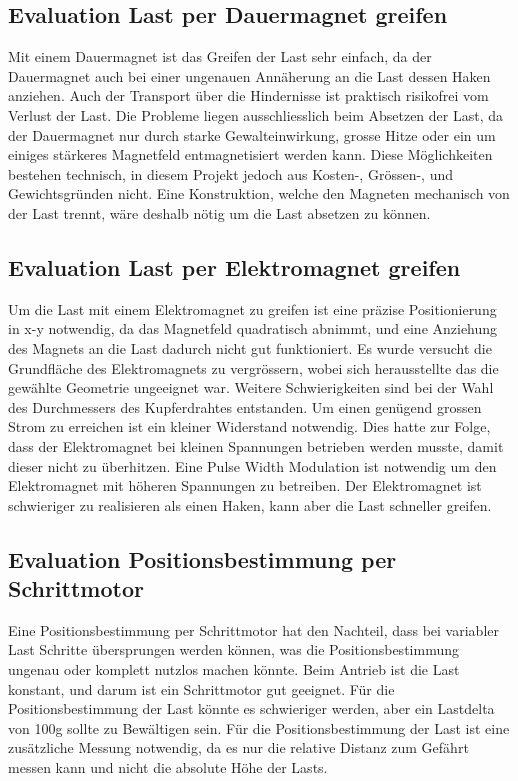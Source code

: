 \documentclass[a4paper]{report}
\begin{document}
\subsection{Evaluation Last per Dauermagnet greifen}
\label{app:ssec:EvalLastMagnet}
Mit einem Dauermagnet ist das Greifen der Last sehr einfach, da der Dauermagnet auch bei einer ungenauen Annäherung an die Last dessen Haken anziehen. Auch der Transport über die Hindernisse ist praktisch risikofrei vom Verlust der Last. Die Probleme liegen ausschliesslich beim Absetzen der Last, da der Dauermagnet nur durch starke Gewalteinwirkung, grosse Hitze oder ein um einiges stärkeres Magnetfeld entmagnetisiert werden kann. Diese Möglichkeiten bestehen technisch, in diesem Projekt jedoch aus Kosten-, Grössen-, und Gewichtsgründen nicht. Eine Konstruktion, welche den Magneten mechanisch von der Last trennt, wäre deshalb nötig um die Last absetzen zu können.

\subsection{Evaluation Last per Elektromagnet greifen}
\label{app:ssec:EvalLastElektroMagnet}
Um die Last mit einem Elektromagnet zu greifen ist eine präzise Positionierung in x-y notwendig, da das Magnetfeld quadratisch abnimmt, und eine Anziehung des Magnets an die Last dadurch nicht gut funktioniert. Es wurde versucht die Grundfläche des Elektromagnets zu vergrössern, wobei sich herausstellte das die gewählte Geometrie ungeeignet war. Weitere Schwierigkeiten sind bei der Wahl des Durchmessers des Kupferdrahtes entstanden. Um einen genügend grossen Strom zu erreichen ist ein kleiner Widerstand notwendig. Dies hatte zur Folge, dass der Elektromagnet bei kleinen Spannungen betrieben werden musste, damit dieser nicht zu überhitzen. Eine Pulse Width Modulation ist notwendig um den Elektromagnet mit höheren Spannungen zu betreiben. Der Elektromagnet ist schwieriger zu realisieren als einen Haken, kann aber die Last schneller greifen.

\subsection{Evaluation Positionsbestimmung per Schrittmotor}
\label{app:ssec:EvalPosBestSchritt}
Eine Positionsbestimmung per Schrittmotor hat den Nachteil, dass bei variabler Last Schritte übersprungen werden können, was die Positionsbestimmung ungenau oder komplett nutzlos machen könnte. Beim Antrieb ist die Last konstant, und darum ist ein Schrittmotor gut geeignet. Für die Positionsbestimmung der Last könnte es schwieriger werden, aber ein Lastdelta von 100g sollte zu Bewältigen sein. Für die Positionsbestimmung der Last ist eine zusätzliche Messung notwendig, da es nur die relative Distanz zum Gefährt messen kann und nicht die absolute Höhe der Lasts.
\end{document}
